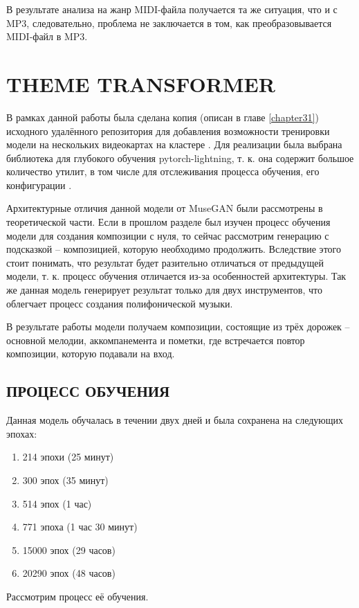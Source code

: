 В результате анализа на жанр MIDI-файла получается та же ситуация, что и с MP3, следовательно, проблема не заключается в том, как преобразовывается MIDI-файл в MP3.


\section{THEME TRANSFORMER}
В рамках данной работы была сделана копия (описан в главе \ref{chapter31}) исходного удалённого репозитория для добавления возможности тренировки модели на нескольких видеокартах на кластере  \cite{theme_source}. Для реализации была выбрана библиотека для глубокого обучения pytorch-lightning, т. к. она содержит большое количество утилит, в том числе для отслеживания процесса обучения, его конфигурации \cite{torch_lightning}.

Архитектурные отличия данной модели от MuseGAN были рассмотрены в теоретической части. Если в прошлом разделе был изучен процесс обучения модели для создания композиции с нуля, то сейчас рассмотрим генерацию с подсказкой -- композицией, которую необходимо продолжить. Вследствие этого стоит понимать, что результат будет разительно отличаться от предыдущей модели, т. к. процесс обучения отличается из-за особенностей архитектуры. Так же данная модель генерирует результат только для двух инструментов, что облегчает процесс создания полифонической музыки. 

В результате работы модели получаем композиции, состоящие из трёх дорожек -- основной мелодии, аккомпанемента и пометки, где встречается повтор композиции, которую подавали на вход. 


\subsection{ПРОЦЕСС ОБУЧЕНИЯ}
Данная модель обучалась в течении двух дней и была сохранена на следующих эпохах:
\begin{enumerate}
    \item 214 эпохи (25 минут)
    \item 300 эпох (35 минут)
    \item 514 эпох (1 час)
    \item 771 эпоха (1 час 30 минут)
    \item 15000 эпох (29 часов)
    \item 20290 эпох (48 часов)
\end{enumerate}

Рассмотрим процесс её обучения.

